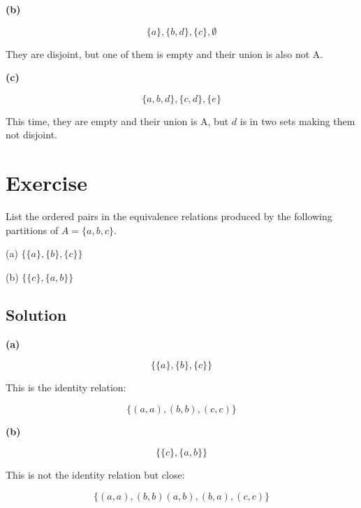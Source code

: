 \documentclass[paper=a4, fontsize=11pt]{scrartcl} %
\numberwithin{equation}{section} %
\numberwithin{figure}{section} %
\numberwithin{table}{section} %
\begin{document}
\textbf{(b)}

$$\{a\},\{b,d\},\{c\},\emptyset$$

They are disjoint, but one of them is empty and their union is also not A.

\textbf{(c)}

$$\{a,b,d\},\{c,d\},\{e\}$$

This time, they are empty and their union is A, but $d$ is in two sets making them not disjoint.



\section{Exercise}

List the ordered pairs in the equivalence relations produced by the following
partitions of $A = \{a,b,c\}$.

(a) $\{\{a\},\{b\},\{c\}\}$

(b) $\{\{c\},\{a,b\}\}$

\subsection{Solution}

\textbf{(a)}

$$\{\{a\},\{b\},\{c\}\}$$

This is the identity relation:

$$\{(a,a),(b,b),(c,c)\}$$

\textbf{(b)}

$$\{\{c\},\{a,b\}\}$$

This is not the identity relation but close:

$$\{(a,a),(b,b)(a,b),(b,a),(c,c)\}$$


\end{document}
